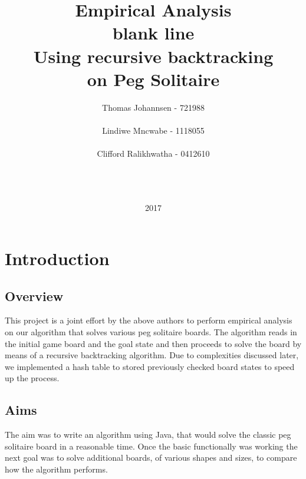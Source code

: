 \documentclass[11pt]{article}
\title{%
\Huge Empirical Analysis\\
\color{white} blank line\\
\color{black}
\Large
Using recursive backtracking\\
on Peg Solitaire}
\date{2017}
\author{Thomas Johannsen - 721988\\\\Lindiwe Mncwabe - 1118055\\\\Clifford Ralikhwatha - 0412610\\\\\\\\}
\begin{document}
\maketitle
{}
\newpage
\tableofcontents
\listoffigures
\newpage
{}
\section{Introduction}
\subsection{Overview}
This project is a joint effort by the above authors to perform empirical analysis on our algorithm that solves various peg solitaire boards. The algorithm reads in the initial game board and the goal state and then proceeds to solve the board by means of a recursive backtracking algorithm. Due to complexities discussed later, we implemented a hash table to stored previously checked board states to speed up the process.
\subsection{Aims}
The aim was to write an algorithm using Java, that would solve the classic peg\\ solitaire board in a reasonable time. Once the basic functionally was working the next goal was to solve additional boards, of various shapes and sizes, to compare how the algorithm performs.\\
\newpage
\end{document}
